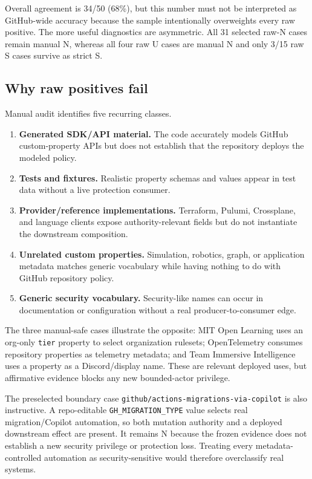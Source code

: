 \documentclass[sigconf,review,anonymous]{acmart}
\newcommand{\U}{\textsf{U}}
\newcommand{\Ssafe}{\textsf{S}}
\newcommand{\N}{\textsf{N}}
\begin{document}
Overall agreement is 34/50 (68\%), but this number must not be interpreted as
GitHub-wide accuracy because the sample intentionally overweights every raw
positive.  The more useful diagnostics are asymmetric.  All 31 selected raw-\N{}
cases remain manual \N{}, whereas all four raw \U{} cases are manual \N{} and
only 3/15 raw \Ssafe{} cases survive as strict \Ssafe{}.

\subsection{Why raw positives fail}

Manual audit identifies five recurring classes.

\begin{enumerate}[leftmargin=*,nosep]
  \item \textbf{Generated SDK/API material.}  The code accurately models
  GitHub custom-property APIs but does not establish that the repository deploys
  the modeled policy.
  \item \textbf{Tests and fixtures.}  Realistic property schemas and values
  appear in test data without a live protection consumer.
  \item \textbf{Provider/reference implementations.}  Terraform, Pulumi,
  Crossplane, and language clients expose authority-relevant fields but do not
  instantiate the downstream composition.
  \item \textbf{Unrelated custom properties.}  Simulation, robotics, graph, or
  application metadata matches generic vocabulary while having nothing to do
  with GitHub repository policy.
  \item \textbf{Generic security vocabulary.}  Security-like names can occur in
  documentation or configuration without a real producer-to-consumer edge.
\end{enumerate}

The three manual-safe cases illustrate the opposite: MIT Open Learning uses an
org-only \texttt{tier} property to select organization rulesets;
OpenTelemetry consumes repository properties as telemetry metadata; and Team
Immersive Intelligence uses a property as a Discord/display name.  These are
relevant deployed uses, but affirmative evidence blocks any new bounded-actor
privilege.

The preselected boundary case
\nolinkurl{github/actions-migrations-via-copilot} is also instructive.  A
repo-editable \texttt{GH\_MIGRATION\_TYPE} value selects real migration/Copilot
automation, so both mutation authority and a deployed downstream effect are
present.  It remains \N{} because the frozen evidence does not establish a new
security privilege or protection loss.  Treating every metadata-controlled
automation as security-sensitive would therefore overclassify real systems.
\end{document}
